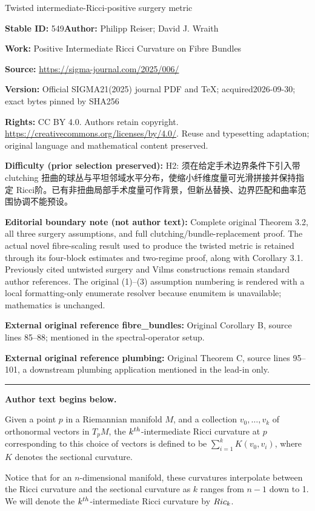 \documentclass[11pt]{article}
\numberwithin{equation}{section}
\numberwithin{equation}{section}
\begin{document}
\begin{center}\Large Twisted intermediate-Ricci-positive surgery metric\end{center}
\noindent\textbf{Stable ID:} 549\quad\textbf{Author:} Philipp Reiser; David J. Wraith\par
\noindent\textbf{Work:} Positive Intermediate Ricci Curvature on Fibre Bundles\par
\noindent\textbf{Source:} \url{https://sigma-journal.com/2025/006/}\par
\noindent\textbf{Version:} Official SIGMA21(2025) journal PDF and TeX; acquired2026-09-30; exact bytes pinned by SHA256\par
\noindent\textbf{Rights:} CC BY 4.0. Authors retain copyright. \url{https://creativecommons.org/licenses/by/4.0/}. Reuse and typesetting adaptation; original language and mathematical content preserved.\par
\noindent\textbf{Difficulty (prior selection preserved):} {\CJKfont H2: 须在给定手术边界条件下引入带 clutching 扭曲的球丛与平坦邻域水平分布，使缩小纤维度量可光滑拼接并保持指定 Ricci阶。已有非扭曲局部手术度量可作背景，但新丛替换、边界匹配和曲率范围协调不能预设。}\par
\medskip\noindent\textbf{Editorial boundary note (not author text):} Complete original Theorem 3.2, all three surgery assumptions, and full clutching/bundle-replacement proof. The actual novel fibre-scaling result used to produce the twisted metric is retained through its four-block estimates and two-regime proof, along with Corollary 3.1. Previously cited untwisted surgery and Vilms constructions remain standard author references. The original (1)–(3) assumption numbering is rendered with a local formatting-only enumerate resolver because enumitem is unavailable; mathematics is unchanged.\par
\noindent\textbf{External original reference fibre\_bundles:} Original Corollary B, source lines 85–88; mentioned in the spectral-operator setup.\par
\noindent\textbf{External original reference plumbing:} Original Theorem C, source lines 95–101, a downstream plumbing application mentioned in the lead-in only.\par
\medskip\hrule\medskip\noindent\textbf{Author text begins below.}\par
\setcounter{section}{1}
\begin{Definition}
	Given a point $p$ in a Riemannian manifold $M$, and a collection $v_0,\dots,v_k$ of orthonormal vectors in $T_pM$, the $k^{\rm th}$-intermediate Ricci curvature at $p$ corresponding to this choice of vectors is defined to be $\sum_{i=1}^k K(v_0,v_i)$, where $K$ denotes the sectional curvature.
\end{Definition}
Notice that for an $n$-dimensional manifold, these curvatures interpolate between the Ricci curvature and the sectional curvature as $k$ ranges from $n-1$ down to 1. We will denote the $k^{\rm th}$-intermediate Ricci curvature by ${\rm Ric}_k$.
\end{document}
